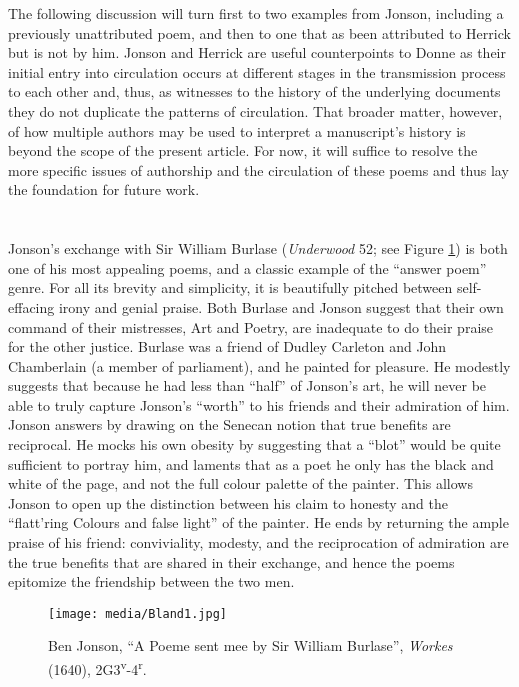 \begin{paper}
The following discussion will turn first to two examples from Jonson,
including a previously unattributed poem, and then to one that as been
attributed to Herrick but is not by him. Jonson and Herrick are useful
counterpoints to Donne as their initial entry into circulation occurs at
different stages in the transmission process to each other and, thus, as
witnesses to the history of the underlying documents they do not
duplicate the patterns of circulation. That broader matter, however, of
how multiple authors may be used to interpret a manuscript's history is
beyond the scope of the present article. For now, it will suffice to
resolve the more specific issues of authorship and the circulation of
these poems and thus lay the foundation for future work.

\section*{}

Jonson's exchange with Sir William Burlase (\emph{Underwood} 52; see Figure \ref{fig:bland:poemetext}) is both
one of his most appealing poems, and a classic example of the ``answer
poem'' genre. For all its brevity and simplicity, it is beautifully
pitched between self-effacing irony and genial praise. Both Burlase and
Jonson suggest that their own command of their mistresses, Art and Poetry,
are inadequate to do their praise for the other justice. Burlase was a friend of
Dudley Carleton and John Chamberlain (a member of parliament), and he
painted for pleasure. He modestly suggests that because he had less than
``half'' of Jonson's art, he will never be able to truly capture Jonson's ``worth'' to
his friends and their admiration of him. Jonson answers by drawing on
the Senecan notion that true benefits are reciprocal. He mocks his own
obesity by suggesting that a ``blot'' would be quite sufficient to portray
him, and laments that as a poet he only has the black and white of the page, and not
the full colour palette of the painter. This allows Jonson to open up
the distinction between his claim to honesty and the ``flatt'ring Colours and
false light'' of the painter. He ends by returning the ample praise of
his friend: conviviality, modesty, and the reciprocation of admiration
are the true benefits that are shared in their exchange, and hence the
poems epitomize the friendship between the two men.

\begin{figure}
    \centering
    \texttt{[image: media/Bland1.jpg]} \caption{Ben Jonson, ``A Poeme sent mee by Sir William Burlase'', \emph{Workes} (1640), 2G3\textsuperscript{v}-4\textsuperscript{r}.}
    \label{fig:bland:poemetext}
\end{figure}


\end{paper}
